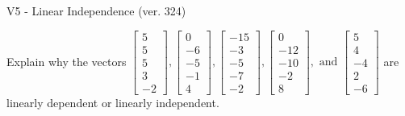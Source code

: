 \begin{exercise}
  \begin{exerciseTitle}V5 - Linear Independence (ver. 324)\end{exerciseTitle}
  \begin{exerciseStatement}
    Explain why the vectors \(\left[\begin{array}{r}
5 \\
5 \\
5 \\
3 \\
-2
\end{array}\right] , \left[\begin{array}{r}
0 \\
-6 \\
-5 \\
-1 \\
4
\end{array}\right] , \left[\begin{array}{r}
-15 \\
-3 \\
-5 \\
-7 \\
-2
\end{array}\right] , \left[\begin{array}{r}
0 \\
-12 \\
-10 \\
-2 \\
8
\end{array}\right] , \text{ and } \left[\begin{array}{r}
5 \\
4 \\
-4 \\
2 \\
-6
\end{array}\right]\) are linearly dependent or linearly independent.	



\end{exerciseStatement}
\end{exercise}
